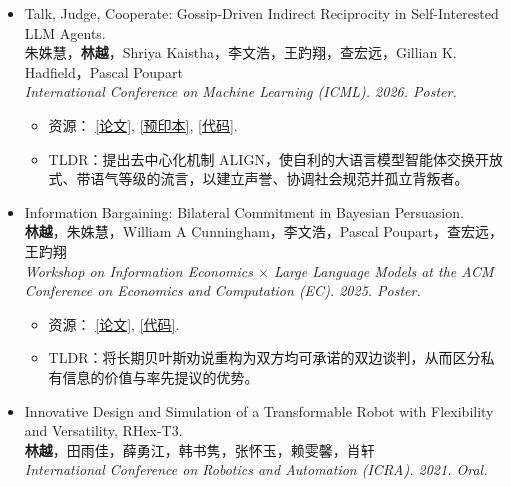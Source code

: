 \documentclass[a4paper,20pt]{article}
\begin{document}
\begin{itemize}[leftmargin=*,itemsep=0pt,topsep=0pt,partopsep=0pt]
\begin{itemize}[itemsep=0pt,topsep=0pt,partopsep=0pt]
          \end{itemize}
    \item Talk, Judge, Cooperate: Gossip-Driven Indirect Reciprocity in Self-Interested LLM Agents. \\
          朱姝慧，\textbf{林越}，Shriya Kaistha，李文浩，王趵翔，查宏远，Gillian K. Hadfield，Pascal Poupart \\
          \textit{International Conference on Machine Learning (ICML). 2026. Poster.}
          \begin{itemize}[itemsep=0pt,topsep=0pt,partopsep=0pt]
              \item 资源：
                    \href{https://openreview.net/forum?id=jYxRNCfRaD}{[论文]},
                    \href{https://arxiv.org/abs/2602.07777}{[预印本]},
                    \href{https://github.com/shuhui-zhu/ALIGN}{[代码]}.
              \item TLDR：提出去中心化机制 ALIGN，使自利的大语言模型智能体交换开放式、带语气等级的流言，以建立声誉、协调社会规范并孤立背叛者。
          \end{itemize}
    \item Information Bargaining: Bilateral Commitment in Bayesian Persuasion. \\
          \textbf{林越}，朱姝慧，William A Cunningham，李文浩，Pascal Poupart，查宏远，王趵翔 \\
          \textit{Workshop on Information Economics $\times$ Large Language Models at the ACM Conference on Economics and Computation (EC). 2025. Poster.}
          \begin{itemize}[itemsep=0pt,topsep=0pt,partopsep=0pt]
              \item 资源：
                    \href{https://arxiv.org/abs/2506.05876}{[论文]},
                    \href{https://github.com/YueLin301/InformationBargaining}{[代码]}.
              \item TLDR：将长期贝叶斯劝说重构为双方均可承诺的双边谈判，从而区分私有信息的价值与率先提议的优势。
          \end{itemize}
    \item Innovative Design and Simulation of a Transformable Robot with Flexibility and Versatility, RHex-T3. \\
          \textbf{林越}，田雨佳，薛勇江，韩书隽，张怀玉，赖雯馨，肖轩 \\
          \textit{International Conference on Robotics and Automation (ICRA). 2021. Oral.}
          \begin{itemize}[itemsep=0pt,topsep=0pt,partopsep=0pt]

\end{itemize}
\end{itemize}
\end{document}
